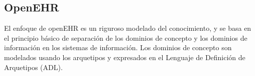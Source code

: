 \subsection{OpenEHR}

El enfoque de openEHR es un riguroso modelado del conocimiento, y se basa en el principio básico de separación de los dominios de concepto y los dominios de información en los sistemas de información. Los dominios de concepto son modelados usando los arquetipos y expresados en el Lenguaje de Definición de Arquetipos (ADL).






